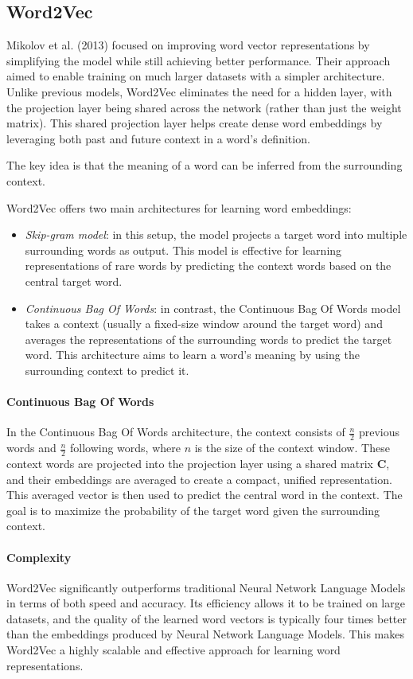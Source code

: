 \subsection{Word2Vec}
Mikolov et al. (2013) focused on improving word vector representations by simplifying the model while still achieving better performance. 
Their approach aimed to enable training on much larger datasets with a simpler architecture. 
Unlike previous models, Word2Vec eliminates the need for a hidden layer, with the projection layer being shared across the network (rather than just the weight matrix). 
This shared projection layer helps create dense word embeddings by leveraging both past and future context in a word's definition.

The key idea is that the meaning of a word can be inferred from the surrounding context.

Word2Vec offers two main architectures for learning word embeddings:
\begin{itemize}
    \item \textit{Skip-gram model}: in this setup, the model projects a target word into multiple surrounding words as output. 
        This model is effective for learning representations of rare words by predicting the context words based on the central target word.
        \item \textit{Continuous Bag Of Words}: in contrast, the Continuous Bag Of Words model takes a context (usually a fixed-size window around the target word) and averages the representations of the surrounding words to predict the target word. 
        This architecture aims to learn a word's meaning by using the surrounding context to predict it.
\end{itemize}

\paragraph*{Continuous Bag Of Words}
In the Continuous Bag Of Words architecture, the context consists of $\frac{n}{2}$ previous words and $\frac{n}{2}$ following words, where $n$ is the size of the context window.
These context words are projected into the projection layer using a shared matrix $\mathbf{C}$, and their embeddings are averaged to create a compact, unified representation.
This averaged vector is then used to predict the central word in the context. 
The goal is to maximize the probability of the target word given the surrounding context.

\paragraph*{Complexity}
Word2Vec significantly outperforms traditional Neural Network Language Models in terms of both speed and accuracy. 
Its efficiency allows it to be trained on large datasets, and the quality of the learned word vectors is typically four times better than the embeddings produced by Neural Network Language Models. 
This makes Word2Vec a highly scalable and effective approach for learning word representations.